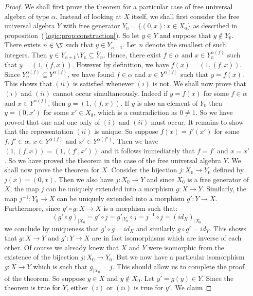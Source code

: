 \begin{proof}
We shall first prove the theorem for a particular case of free
universal algebra of type $\alpha$. Instead of looking at $X$
itself, we shall first consider the free universal algebra $Y$ with
free generator $Y_{0}=\{(0,x): x\in X_{0}\}$ as described in
proposition~(\ref{logic:prop:construction}). So let $y\in Y$ and
suppose that $y\not\in Y_{0}$. There exists $n\in\N$ such that $y\in
Y_{n+1}$. Let $n$ denote the smallest of such integers. Then $y\in
Y_{n+1}\setminus Y_{n}\subseteq\bar{Y}_{n}$. Hence, there exist
$f\in\alpha$ and $x\in Y_{n}^{\alpha(f)}$ such that $y=(1,(f,x))$.
However by definition, we have $f(x)=(1,(f,x))$. Since
$Y_{n}^{\alpha(f)}\subseteq Y^{\alpha(f)}$, we have found
$f\in\alpha$ and $x\in Y^{\alpha(f)}$ such that $y=f(x)$. This shows
that $(ii)$ is satisfied whenever $(i)$ is not. We shall now prove
that $(i)$ and $(ii)$ cannot occur simultaneously. Indeed if
$y=f(x)$ for some $f\in\alpha$ and $x\in Y^{\alpha(f)}$, then
$y=(1,(f,x))$. If $y$ is also an element of $Y_{0}$ then $y=(0,x')$
for some $x'\in X_{0}$, which is a contradiction as $0\neq 1$. So we
have proved that one and one only of $(i)$ and $(ii)$ must occur. It
remains to show that the representation $(ii)$ is unique. So suppose
$f(x)=f'(x')$ for some $f,f'\in\alpha$, $x\in Y^{\alpha(f)}$ and
$x'\in Y^{\alpha(f')}$. Then we have $(1,(f,x))=(1,(f',x'))$ and it
follows immediately that $f=f'$ and $x=x'$. So we have proved the
theorem in the case of the free universal algebra $Y$. We shall now
prove the theorem for $X$. Consider the bijection $j:X_{0}\to Y_{0}$
defined by $j(x)=(0,x)$. Then we also have $j:X_{0}\to Y$ and since
$X_{0}$ is a free generator of $X$, the map $j$ can be uniquely
extended into a morphism $g:X\to Y$. Similarly, the map
$j^{-1}:Y_{0}\to X$ can be uniquely extended into a morphism
$g':Y\to X$. Furthermore, since $g'\circ g:X\to X$ is a morphism
such that:
    \[
    (g'\circ g)_{|X_{0}}=g'\circ j=g'_{|Y_{0}}\circ j=j^{-1}\circ j = (id_{X})_{|X_{0}}
    \]
we conclude by uniqueness that $g'\circ g=id_{X}$ and similarly
$g\circ g'=id_{Y}$. This shows that $g:X\to Y$ and $g':Y\to X$ are
in fact isomorphisms which are inverse of each other. Of course we
already knew that $X$ and $Y$ were isomorphic from the existence of
the bijection $j:X_{0}\to Y_{0}$. But we now have a particular
isomorphism $g:X\to Y$ which is such that $g_{|X_{0}}=j$. This
should allow us to complete the proof of the theorem. So suppose
$y\in X$ and $y\not\in X_{0}$. Let $y'=g(y)\in Y$. Since the theorem
is true for $Y$, either $(i)$ or $(ii)$ is true for $y'$. We claim

\end{proof}
